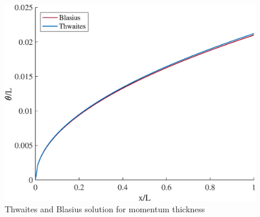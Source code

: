 



\begin{figure}[H]
\centering
\includegraphics[scale=0.65]{graphs/e1g1.eps}
\caption{Thwaites and Blasius solution for momentum thickness}
\label{e1g1}
\end{figure}